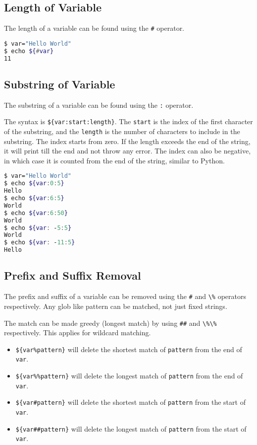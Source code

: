 \subsection{Length of Variable}

The length of a variable can be found using the \lstinline{#} operator.

\begin{lstlisting}[language=bash]
$ var="Hello World"
$ echo ${#var}
11
\end{lstlisting}

\subsection{Substring of Variable}

The substring of a variable can be found using the \lstinline{:} operator.

The syntax is \lstinline|${var:start:length}|. The \lstinline{start} is the index of the first character of the substring, and the \lstinline{length} is the number of characters to include in the substring. The index starts from zero.
If the length exceeds the end of the string, it will print till the end and not throw any error.
The index can also be negative, in which case it is counted from the end of the string, similar to Python.

\begin{lstlisting}[language=bash]
$ var="Hello World"
$ echo ${var:0:5}
Hello
$ echo ${var:6:5}
World
$ echo ${var:6:50}
World
$ echo ${var: -5:5}
World
$ echo ${var: -11:5}
Hello
\end{lstlisting}

\subsection{Prefix and Suffix Removal}

The prefix and suffix of a variable can be removed using the \lstinline{#} and \lstinline{\%} operators respectively. Any glob like pattern can be matched, not just fixed strings.

The match can be made greedy (longest match) by using \lstinline{##} and \lstinline{\%\%} respectively.
This applies for wildcard matching.


\begin{itemize}
  \item
    \lstinline|${var%pattern}| will delete the shortest match of \lstinline{pattern} from the end of \lstinline{var}.
  \item
    \lstinline|${var%%pattern}| will delete the longest match of \lstinline{pattern} from the end of \lstinline{var}.
  \item
    \lstinline|${var#pattern}| will delete the shortest match of \lstinline{pattern} from the start of \lstinline{var}.
  \item
    \lstinline|${var##pattern}| will delete the longest match of \lstinline{pattern} from the start of \lstinline{var}.
\end{itemize}

